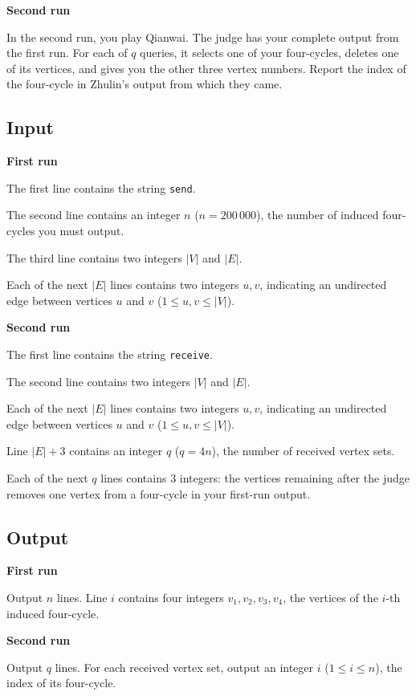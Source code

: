 \textbf{Second run}

In the second run, you play Qianwai. The judge has your complete output from the first run. For each of $q$ queries, it selects one of your four-cycles, deletes one of its vertices, and gives you the other three vertex numbers. Report the index of the four-cycle in Zhulin's output from which they came.

\subsection{Input}

\textbf{First run}

The first line contains the string \texttt{send}.

The second line contains an integer $n$ ($n=200\,000$), the number of induced four-cycles you must output.

The third line contains two integers $|V|$ and $|E|$.

Each of the next $|E|$ lines contains two integers $u,v$, indicating an undirected edge between vertices $u$ and $v$ ($1 \le u,v \le |V|$).

\textbf{Second run}

The first line contains the string \texttt{receive}.

The second line contains two integers $|V|$ and $|E|$.

Each of the next $|E|$ lines contains two integers $u,v$, indicating an undirected edge between vertices $u$ and $v$ ($1 \le u,v \le |V|$).

Line $|E|+3$ contains an integer $q$ ($q=4n$), the number of received vertex sets.

Each of the next $q$ lines contains $3$ integers: the vertices remaining after the judge removes one vertex from a four-cycle in your first-run output.

\subsection{Output}

\textbf{First run}

Output $n$ lines. Line $i$ contains four integers $v_1,v_2,v_3,v_4$, the vertices of the $i$-th induced four-cycle.

\textbf{Second run}

Output $q$ lines. For each received vertex set, output an integer $i$ ($1 \le i \le n$), the index of its four-cycle.

